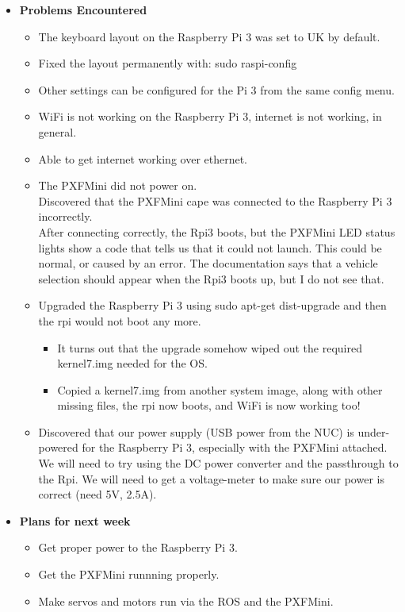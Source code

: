 \documentclass{article}
\begin{document}
\begin{itemize}
    \item {\textbf{Problems Encountered}}
    \begin{itemize}
        \item The keyboard layout on the Raspberry Pi 3 was set to UK by default.
        \item Fixed the layout permanently with: sudo raspi-config
        \item Other settings can be configured for the Pi 3 from the same config menu.
        \item WiFi is not working on the Raspberry Pi 3, internet is not working, in general.
        \item Able to get internet working over ethernet.
        \item The PXFMini did not power on.\\
        Discovered that the PXFMini cape was connected to the Raspberry Pi 3 incorrectly.\\
        After connecting correctly, the Rpi3 boots, but the PXFMini LED status lights show a code that tells us that it could not launch. This could be normal, or caused by an error. The documentation says that a vehicle selection should appear when the Rpi3 boots up, but I do not see that.
        \item Upgraded the Raspberry Pi 3 using sudo apt-get dist-upgrade and then the rpi would not boot any more.
        \begin{itemize}
            \item It turns out that the upgrade somehow wiped out the required kernel7.img needed for the OS.
            \item Copied a kernel7.img from another system image, along with other missing files, the rpi now boots, and WiFi is now working too!
        \end{itemize}
        \item Discovered that our power supply (USB power from the NUC) is under-powered for the Raspberry Pi 3, especially with the PXFMini attached. We will need to try using the DC power converter and the passthrough to the Rpi. We will need to get a voltage-meter to make sure our power is correct (need 5V, 2.5A).
    \end{itemize}

    \item{\textbf{Plans for next week}}
    \begin{itemize}
        \item Get proper power to the Raspberry Pi 3.
        \item Get the PXFMini runnning properly.
        \item Make servos and motors run via the ROS and the PXFMini.
    \end{itemize}
\end{itemize}
\end{document}
